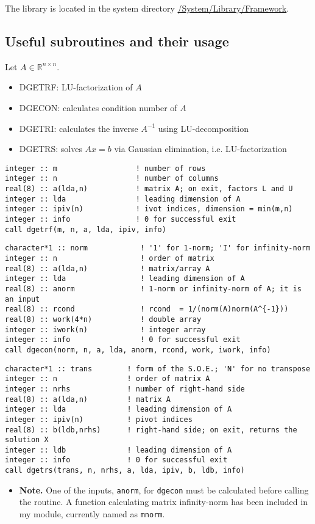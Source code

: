 \documentclass[11pt]{article}
\begin{document}
The library is located in the system directory \href{file:///System/Library/Frameworks/Accelerate.framework/}{/System/Library/Framework}.

\subsection{Useful subroutines and their usage}
\label{sec:orgf3d08d5}
Let \(A \in \mathbb{R}^{n \times n}\).
\begin{itemize}
\item DGETRF: LU-factorization of \(A\)
\item DGECON: calculates condition number of \(A\)
\item DGETRI: calculates the inverse \(A^{-1}\) using LU-decomposition
\item DGETRS: solves \(A x = b\) via Gaussian elimination, i.e. LU-factorization
\end{itemize}

\begin{verbatim}
integer :: m                  ! number of rows
integer :: n                  ! number of columns
real(8) :: a(lda,n)           ! matrix A; on exit, factors L and U
integer :: lda                ! leading dimension of A
integer :: ipiv(n)            ! ivot indices, dimension = min(m,n)
integer :: info               ! 0 for successful exit
call dgetrf(m, n, a, lda, ipiv, info)
\end{verbatim}

\begin{verbatim}
character*1 :: norm            ! '1' for 1-norm; 'I' for infinity-norm
integer :: n                   ! order of matrix
real(8) :: a(lda,n)            ! matrix/array A
integer :: lda                 ! leading dimension of A
real(8) :: anorm               ! 1-norm or infinity-norm of A; it is an input
real(8) :: rcond               ! rcond  = 1/(norm(A)norm(A^{-1}))
real(8) :: work(4*n)           ! double array
integer :: iwork(n)            ! integer array
integer :: info                ! 0 for successful exit
call dgecon(norm, n, a, lda, anorm, rcond, work, iwork, info)
\end{verbatim}

\begin{verbatim}
character*1 :: trans        ! form of the S.O.E.; 'N' for no transpose
integer :: n                ! order of matrix A
integer :: nrhs             ! number of right-hand side
real(8) :: a(lda,n)         ! matrix A
integer :: lda              ! leading dimension of A
integer :: ipiv(n)          ! pivot indices
real(8) :: b(ldb,nrhs)      ! right-hand side; on exit, returns the solution X
integer :: ldb              ! leading dimension of A
integer :: info             ! 0 for successful exit
call dgetrs(trans, n, nrhs, a, lda, ipiv, b, ldb, info)
\end{verbatim}
\begin{itemize}
\item \textbf{Note.} One of the inputs, \texttt{anorm}, for \texttt{dgecon} must be calculated
before calling the routine. A function calculating matrix
infinity-norm has been included in my module, currently named as
\texttt{mnorm}.
\end{itemize}
\end{document}

